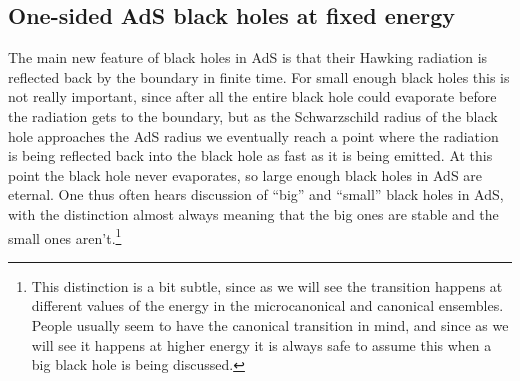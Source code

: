 \documentclass[12pt]{article}
\begin{document}
\subsection{One-sided AdS black holes at fixed energy}\label{microadsbhsec}
The main new feature of black holes in AdS is that their Hawking radiation is reflected back by the boundary in finite time.  For small enough black holes this is not really important, since after all the entire black hole could evaporate before the radiation gets to the boundary, but as the Schwarzschild radius of the black hole approaches the AdS radius we eventually reach a point where the radiation is being reflected back into the black hole as fast as it is being emitted.  At this point the black hole never evaporates, so large enough black holes in AdS are eternal.  One thus often hears discussion of ``big'' and ``small'' black holes in AdS, with the distinction almost always meaning that the big ones are stable and the small ones aren't.\footnote{This distinction is a bit subtle, since as we will see the transition happens at different values of the energy in the microcanonical and canonical ensembles.  People usually seem to have the canonical transition in mind, and since as we will see it happens at higher energy it is always safe to assume this when a big black hole is being discussed.}  
\end{document}
